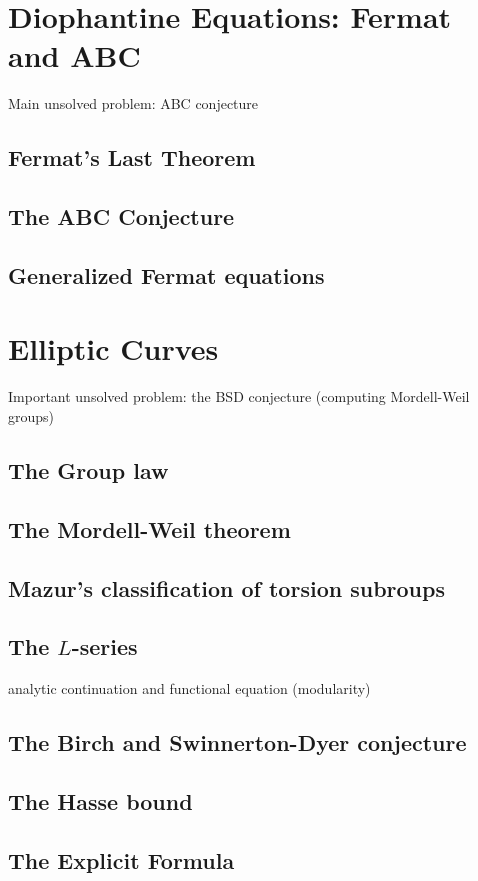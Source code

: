\documentclass{book}
\begin{document}
\chapter{Diophantine Equations: Fermat and ABC}
Main unsolved problem: ABC conjecture

\section{Fermat's Last Theorem}
\section{The ABC Conjecture}
\section{Generalized Fermat equations}



\chapter{Elliptic Curves}
Important unsolved problem: the BSD conjecture (computing Mordell-Weil groups)

\section{The Group law}
\section{The Mordell-Weil theorem}
\section{Mazur's classification of torsion subroups}
\section{The $L$-series}
analytic continuation and functional equation (modularity)
\section{The Birch and Swinnerton-Dyer conjecture}
\section{The Hasse bound}
\section{The Explicit Formula}
\end{document}
